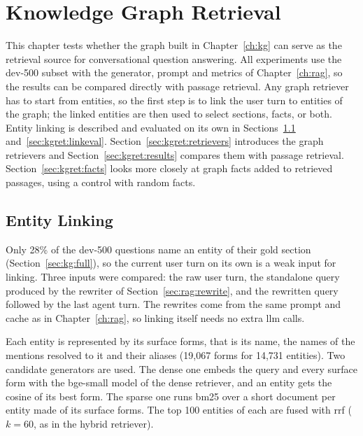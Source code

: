 
\chapter{Knowledge Graph Retrieval}\label{ch:kgret}

This chapter tests whether the graph built in Chapter~\ref{ch:kg} can serve as the
retrieval source for conversational question answering. All experiments use the dev-500
subset with the generator, prompt and metrics of Chapter~\ref{ch:rag}, so the results
can be compared directly with passage retrieval. Any graph retriever has to start from
entities, so the first step is to link the user turn to entities of the graph; the
linked entities are then used to select sections, facts, or both. Entity linking is
described and evaluated on its own in Sections~\ref{sec:kgret:linking}
and~\ref{sec:kgret:linkeval}. Section~\ref{sec:kgret:retrievers} introduces the graph
retrievers and Section~\ref{sec:kgret:results} compares them with passage retrieval.
Section~\ref{sec:kgret:facts} looks more closely at graph facts added to retrieved
passages, using a control with random facts.


\section{Entity Linking}\label{sec:kgret:linking}

Only 28\% of the dev-500 questions name an entity of their gold section
(Section~\ref{sec:kg:full}), so the current user turn on its own is a weak input for
linking. Three inputs were compared: the raw user turn, the standalone query produced by
the rewriter of Section~\ref{sec:rag:rewrite}, and the rewritten query followed by the
last agent turn. The rewrites come from the same prompt and cache as in
Chapter~\ref{ch:rag}, so linking itself needs no extra \gls{llm} calls.

Each entity is represented by its surface forms, that is its name, the names of the
mentions resolved to it and their aliases (19{,}067 forms for 14{,}731 entities). Two
candidate generators are used. The dense one embeds the query and every surface form
with the bge-small model of the dense retriever, and an entity gets the cosine of its
best form. The sparse one runs \gls{bm25} over a short document per entity made of its
surface forms. The top 100 entities of each are fused with \gls{rrf} ($k = 60$, as in
the hybrid retriever).

